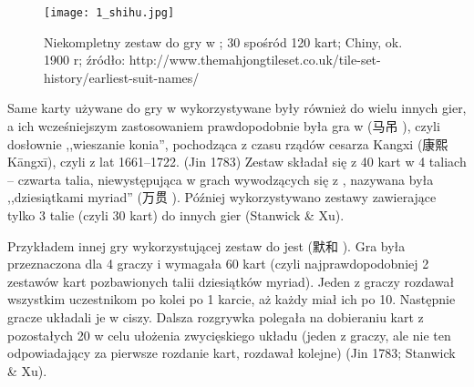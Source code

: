 \begin{figure}[h]
\centering
\texttt{[image: 1\_shihu.jpg]}
\caption{Niekompletny zestaw do gry w ; 30 spośród 120 kart;
Chiny, ok. 1900 r;  źródło:
http://www.themahjongtileset.co.uk/tile-set-history/earliest-suit-names/}
\label{fig:zestawshihu}
\end{figure}

Same karty używane do gry w  wykorzystywane były również do wielu
innych gier, a ich wcześniejszym zastosowaniem prawdopodobnie była gra w
 (马吊 ), czyli dosłownie ,,wieszanie konia'',
pochodząca z czasu rządów cesarza Kangxi (康熙 Kāngxī), czyli z lat 1661--1722.
(Jin 1783) Zestaw  składał się z 40 kart w 4 taliach -- czwarta
talia, niewystępująca w grach wywodzących się z , nazywana była
,,dziesiątkami myriad'' (万贯 ). Później wykorzystywano zestawy
zawierające tylko 3 talie (czyli 30 kart) do innych gier (Stanwick \& Xu).

\label{mohu_page}
Przykładem innej gry wykorzystującej zestaw do  jest
 (默和 ). Gra była przeznaczona dla			
4 graczy i wymagała 60 kart (czyli najprawdopodobniej 2 zestawów kart
 pozbawionych talii dziesiątków myriad). Jeden z graczy rozdawał
wszystkim uczestnikom po kolei po 1 karcie, aż każdy miał ich po 10. Następnie
gracze układali je w ciszy. Dalsza rozgrywka polegała na dobieraniu kart z
pozostałych 20 w celu ułożenia zwycięskiego układu (jeden z graczy, ale nie ten
odpowiadający za pierwsze rozdanie kart, rozdawał kolejne) (Jin 1783; Stanwick
\& Xu).
% 


